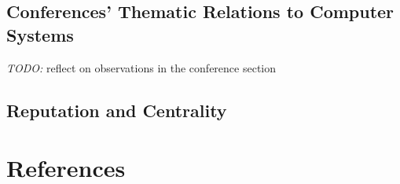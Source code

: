 \documentclass{article}
\newcommand{\todo}[1]{\textit{TODO:} #1}
\begin{document}
\subsection{Conferences' Thematic Relations to Computer Systems}

\todo{reflect on observations in the conference section}

\subsection{Reputation and Centrality}




\section*{References}
\end{document}
